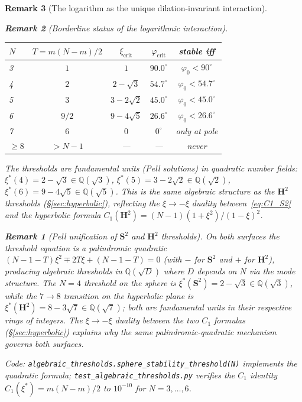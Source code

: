 \documentclass[12pt, a4paper]{article}
\newtheorem{remark}{Remark}[section]
\numberwithin{equation}{section}
\begin{document}
\begin{remark}[The logarithm as the unique dilation-invariant interaction]
\begin{remark}[Borderline status of the logarithmic interaction]
\begin{center}
\begin{tabular}{lcccc}
\toprule
$N$ & $T = m(N{-}m)/2$ & $\xi_{\mathrm{crit}}$ &
  $\varphi_{\mathrm{crit}}$ & stable iff \\
\midrule
3 & $1$ & $1$ & $90.0^\circ$ & $\varphi_0 < 90^\circ$ \\
4 & $2$ & $2 - \sqrt{3}$ & $54.7^\circ$ & $\varphi_0 < 54.7^\circ$ \\
5 & $3$ & $3 - 2\sqrt{2}$ & $45.0^\circ$ & $\varphi_0 < 45.0^\circ$ \\
6 & $9/2$ & $9 - 4\sqrt{5}$ & $26.6^\circ$ & $\varphi_0 < 26.6^\circ$ \\
7 & $6$ & $0$ & $0^\circ$ & only at pole \\
$\ge 8$ & $> N{-}1$ & --- & --- & never \\
\bottomrule
\end{tabular}
\end{center}

\noindent
The thresholds are fundamental units (Pell solutions) in quadratic
number fields: $\xi^*(4) = 2 - \sqrt{3} \in \mathbb{Q}(\sqrt{3})$,
$\xi^*(5) = 3 - 2\sqrt{2} \in \mathbb{Q}(\sqrt{2})$,
$\xi^*(6) = 9 - 4\sqrt{5} \in \mathbb{Q}(\sqrt{5})$.  This is the
\emph{same} algebraic structure as the $\mathbf{H}^2$ thresholds
(\S\ref{sec:hyperbolic}), reflecting the $\xi \to -\xi$ duality
between~\eqref{eq:C1_S2} and the hyperbolic formula
$C_1(\mathbf{H}^2) = (N{-}1)(1+\xi^2)/(1-\xi)^2$.

\begin{remark}[Pell unification of $\mathbf{S}^2$ and $\mathbf{H}^2$ thresholds]
On both surfaces the threshold equation is a palindromic quadratic
$(N{-}1{-}T)\xi^2 \mp 2T\xi + (N{-}1{-}T) = 0$ (with $-$ for
$\mathbf{S}^2$ and $+$ for $\mathbf{H}^2$), producing algebraic
thresholds in $\mathbb{Q}(\sqrt{D})$ where $D$ depends on $N$ via
the mode structure.  The $N = 4$ threshold on the sphere is
$\xi^*(\mathbf{S}^2) = 2 - \sqrt{3} \in \mathbb{Q}(\sqrt{3})$,
while the $7 \to 8$ transition on the hyperbolic plane is
$\xi^*(\mathbf{H}^2) = 8 - 3\sqrt{7} \in \mathbb{Q}(\sqrt{7})$;
both are fundamental units in their respective rings of integers.
The $\xi \to -\xi$ duality between the two $C_1$ formulas
(\S\ref{sec:hyperbolic}) explains why the same palindromic-quadratic
mechanism governs both surfaces.
\end{remark}

\noindent
Code: \texttt{algebraic\_thresholds.sphere\_stability\_threshold(N)}
implements the quadratic formula;
\texttt{test\_algebraic\_thresholds.py} verifies the $C_1$ identity
$C_1(\xi^*) = m(N{-}m)/2$ to $10^{-10}$ for $N = 3, \ldots, 6$.


\end{remark}
\end{remark}
\end{document}

